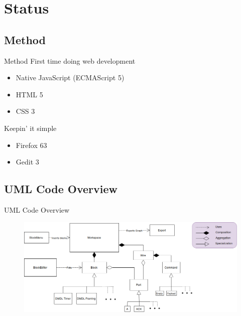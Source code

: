 \documentclass{beamer}
\begin{document}
\section{Status}
\subsection{Method}
\begin{frame}{Method}
	First time doing web development
	\begin{itemize}
		\item Native JavaScript (ECMAScript 5)
		\item HTML 5
		\item CSS 3
	\end{itemize}
	Keepin' it simple
	\begin{itemize}
		\item Firefox 63
		\item Gedit 3
	\end{itemize}
\end{frame}

\subsection{UML Code Overview}
\begin{frame}{UML Code Overview}
\centering
	\begin{figure}
 		\includegraphics[width=\linewidth]{dmdl-editor.png}
		\label{fig:uml}
	\end{figure}
\end{frame}
\end{document}
